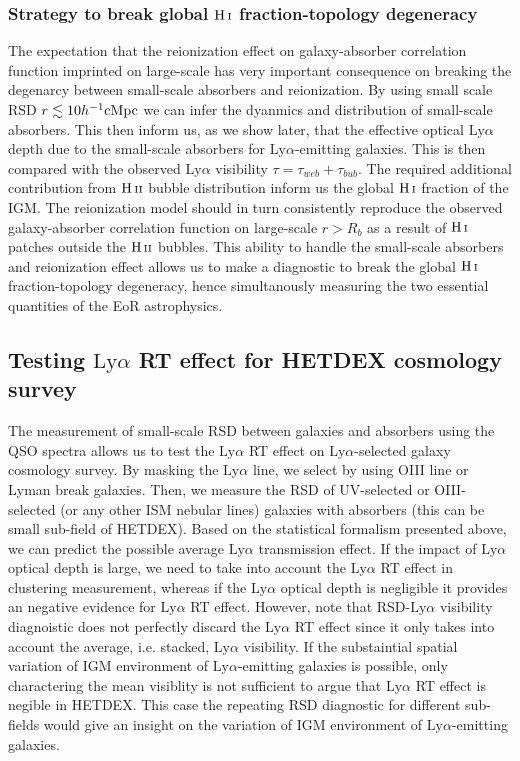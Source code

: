 \documentclass[useAMS,usenatbib,twocolumn]{mn2e}
\newcommand{\HI}{{\rm H\,{\scriptstyle I}}}
\newcommand{\HII}{{\rm H\,{\scriptstyle II}}}
\newcommand{\LyA}{\mbox{Ly}\alpha}
\begin{document}
\subsubsection{Strategy to break global $\HI$ fraction-topology degeneracy}
The expectation that the reionization effect on galaxy-absorber correlation
function imprinted on large-scale has very important consequence on breaking
the degenarcy between small-scale absorbers and reionization. By using small
scale RSD $r\lesssim 10h^{-1}\rm{cMpc}$ we can infer the dyanmics and
distribution of small-scale absorbers. This then inform us, as we show later,
that the effective optical $\LyA$ depth due to the small-scale absorbers
for $\LyA$-emitting galaxies. This is then compared with the observed $\LyA$
visibility $\tau=\tau_{web}+\tau_{bub}$. The required additional contribution from
$\HII$ bubble distribution inform us the global $\HI$ fraction of the IGM.
The reionization model should in turn consistently reproduce the observed 
galaxy-absorber correlation function on large-scale $r>R_b$ as a result
of $\HI$ patches outside the $\HII$ bubbles. This ability to handle the 
small-scale absorbers and reionization effect allows us to make a diagnostic
to break the global $\HI$ fraction-topology degeneracy, hence simultanously
measuring the two essential quantities of the EoR astrophysics.





\subsection{Testing $\LyA$ RT effect for HETDEX cosmology survey}
The measurement of small-scale RSD between galaxies and absorbers using
the QSO spectra allows us to test the $\LyA$ RT effect on $\LyA$-selected
galaxy cosmology survey. By masking the $\LyA$ line, we select by using
OIII line or Lyman break galaxies. Then, we measure the RSD of UV-selected
or OIII-selected (or any other ISM nebular lines) galaxies with absorbers
(this can be small sub-field of HETDEX).
Based on the statistical formalism presented above, we can predict the 
possible average $\LyA$ transmission effect. If the impact of $\LyA$ optical
depth is large, we need to take into account the $\LyA$ RT effect in clustering
measurement, whereas if the $\LyA$ optical depth is negligible it provides 
an negative evidence for $\LyA$ RT effect. However, note that RSD-$\LyA$
visibility diagnoistic does not perfectly discard the $\LyA$ RT effect since
it only takes into account the average, i.e. stacked, $\LyA$ visibility.
If the substaintial spatial variation of IGM environment of $\LyA$-emitting
galaxies is possible, only charactering the mean visiblity is not sufficient
to argue that $\LyA$ RT effect is negible in HETDEX. This case the repeating
RSD diagnostic for different sub-fields would give an insight on the 
variation of IGM environment of $\LyA$-emitting galaxies. 
\end{document}
